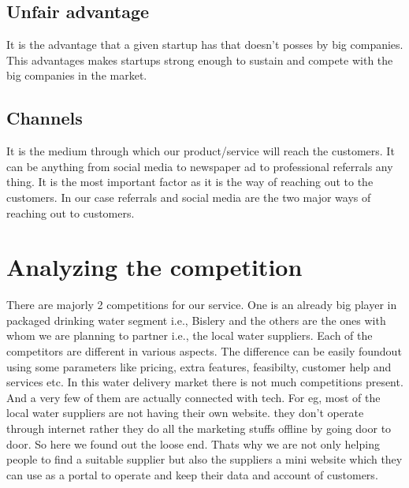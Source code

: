 \documentclass[a4paper, 12pt]{report}
\begin{document}
\subsection[short]{Unfair advantage}
It is the advantage that a given startup has that doesn't posses by big companies. This advantages makes startups strong enough to sustain and
compete with the big companies in the market.

\subsection[short]{Channels}
It is the medium through which our product/service will reach the customers. It can be anything from social media to newspaper ad to professional
referrals any thing. It is the most important factor as it is the way of reaching out to the customers. In our case referrals and social media 
are the two major ways of reaching out to customers.


\section{Analyzing the competition}
There are majorly 2 competitions for our service. One is an already big player in packaged drinking water segment i.e., Bislery and the others are the ones
with whom we are planning to partner i.e., the local water suppliers. Each of the competitors are different in various aspects. The difference can be easily foundout using some parameters like pricing, extra features, feasibilty, customer help and services etc. In this water delivery market there is not much 
competitions present. And a very few of them are actually connected with tech. For eg, most of the local water suppliers are not having their own website.
they don't operate through internet rather they do all the marketing stuffs offline by going door to door. So here we found out the loose end. Thats why we are not only helping people to find a suitable supplier but also the suppliers a mini website which they can use as a portal to operate and keep their data 
and account of customers. 
\end{document}
